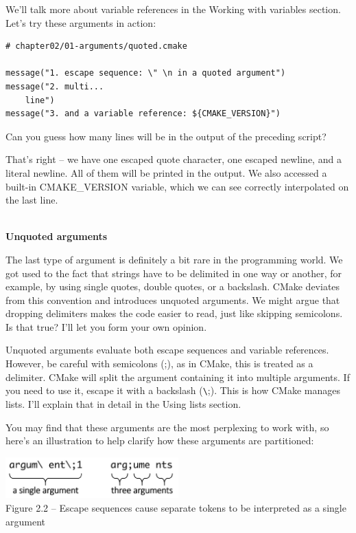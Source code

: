 We'll talk more about variable references in the Working with variables section.
Let's try these arguments in action:

\begin{lstlisting}[style=styleCMake]
# chapter02/01-arguments/quoted.cmake
	
message("1. escape sequence: \" \n in a quoted argument")
message("2. multi...
	line")
message("3. and a variable reference: ${CMAKE_VERSION}")
\end{lstlisting}

Can you guess how many lines will be in the output of the preceding script?


That's right – we have one escaped quote character, one escaped newline, and a literal newline. All of them will be printed in the output. We also accessed a built-in CMAKE\_VERSION variable, which we can see correctly interpolated on the last line.

\hspace*{\fill} \\ %
\noindent
\textbf{Unquoted arguments}

The last type of argument is definitely a bit rare in the programming world. We got used to the fact that strings have to be delimited in one way or another, for example, by using single quotes, double quotes, or a backslash. CMake deviates from this convention and introduces unquoted arguments. We might argue that dropping delimiters makes the code easier to read, just like skipping semicolons. Is that true? I'll let you form your own opinion.

Unquoted arguments evaluate both escape sequences and variable references. However, be careful with semicolons (;), as in CMake, this is treated as a delimiter. CMake will split the argument containing it into multiple arguments. If you need to use it, escape it with a backslash (\verb|\|;). This is how CMake manages lists. I'll explain that in detail in the Using lists section.

You may find that these arguments are the most perplexing to work with, so here's an illustration to help clarify how these arguments are partitioned:

\begin{center}
\includegraphics[width=0.5\textwidth]{content/1/chapter2/images/2.jpg}\\
Figure 2.2 – Escape sequences cause separate tokens to be interpreted as a single argument
\end{center}

